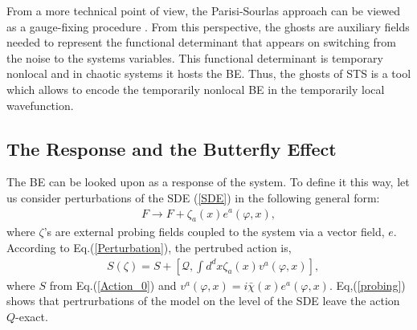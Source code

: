 \documentclass[final,5p,10pt,times,twocolumn,year]{elsarticle}
\begin{document}
From a more technical point of view, the Parisi-Sourlas approach can be viewed as a gauge-fixing procedure \cite{Baulieu_1988,Baulieu_1989,TFT_BOOK}. From this perspective, the ghosts are auxiliary fields needed to represent the functional determinant that appears on switching from the noise to the systems variables. This functional determinant is temporary nonlocal and in chaotic systems it hosts the BE. Thus, the ghosts of STS is a tool which allows to encode the temporarily nonlocal BE in the temporarily local wavefunction. 

\subsection{The Response and the Butterfly Effect}
\label{Sec_Generating_Functional}
The BE can be looked upon as a response of the system. To define it this way, let us consider perturbations of the SDE (\ref{SDE}) in the following general form:
\begin{eqnarray}
F \to F + \zeta_a(x) e^{a}(\varphi,x), \label{Perturbation}
\end{eqnarray}
where $\zeta$'s are external probing fields coupled to the system via a vector field, $e$. According to Eq.(\ref{Perturbation}), the pertrubed action is,
\begin{eqnarray}
    &S(\zeta) = S + [{\mathcal Q}, \int d^{d}x \zeta_{a}(x) v^{a}(\varphi,x)], \label{probing}
\end{eqnarray}
where $S$ from Eq.(\ref{Action_0}) and $v^{a}(\varphi,x) = i\bar\chi(x)e^{a}(\varphi,x)$. Eq,(\ref{probing}) shows that pertrurbations of the model on the level of the SDE leave the action $Q$-exact.
\end{document}
